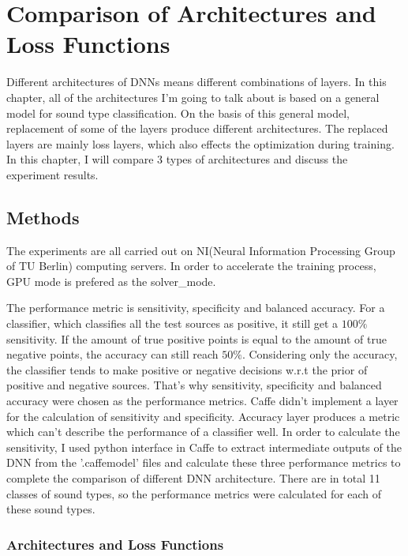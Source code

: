 \chapter{Comparison of Architectures and Loss Functions}
\label{chap:architecture}
Different architectures of DNNs means different combinations of layers. In this chapter, all of the architectures I'm going to talk about is based on a general model for sound type classification. On the basis of this general model, replacement of some of the layers produce different architectures. The replaced layers are mainly loss layers, which also effects the optimization during training. In this chapter, I will compare 3 types of architectures and discuss the experiment results.

\section{Methods}
The experiments are all carried out on NI(Neural Information Processing Group of TU Berlin) computing servers. In order to accelerate the training process, GPU mode is prefered as the solver\_mode. 

The performance metric is sensitivity, specificity and balanced accuracy.%
For a classifier, which classifies all the test sources as positive, it still get a $100\%$ sensitivity. If the amount of true positive points is equal to the amount of true negative points, the accuracy can still reach $50\%$. Considering only the accuracy, the classifier tends to make positive or negative decisions w.r.t the prior of positive and negative sources. That's why  sensitivity, specificity and balanced accuracy were chosen as the performance metrics. Caffe didn't implement a layer for the calculation of sensitivity and specificity. Accuracy layer produces a metric which can't describe the performance of a classifier well. In order to calculate the sensitivity, I used python interface in Caffe to extract intermediate outputs of the DNN from the '.caffemodel' files and calculate these three performance metrics to complete the comparison of different DNN architecture. There are in total 11 classes of sound types, so the performance metrics were calculated for each of these sound types. 

\subsection{Architectures and Loss Functions}
